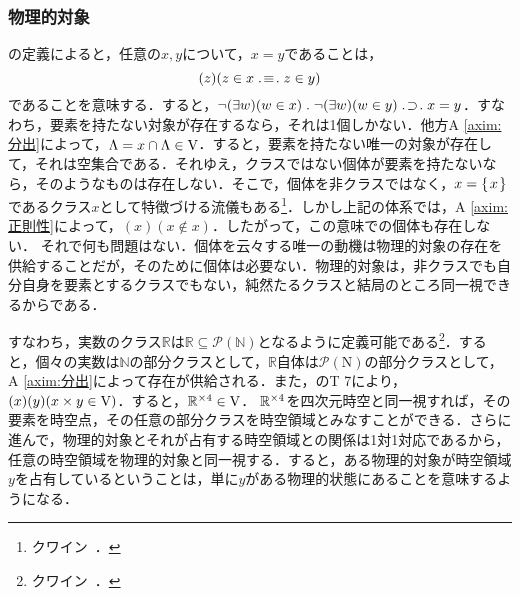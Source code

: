 \subsubsection{物理的対象}
\label{sssec:物理的対象}

の定義によると，任意の$ x,y $について，$ x = y $であることは，
\[
    (z)(z\in x\case{3}{1}{1}z\in y)
\]
であることを意味する．すると，$ \neg(\exists w)(w\in x)\con{1}\neg(\exists w)(w\in y)\case{1}{1}{1}x = y $．すなわち，要素を持たない対象が存在するなら，それは1個しかない．他方A \ref{axim:分出}によって，$ \Lambda = x\cap\Lambda\in\mathrm{V} $．すると，要素を持たない唯一の対象が存在して，それは空集合である．それゆえ，クラスではない個体が要素を持たないなら，そのようなものは存在しない．そこで，個体を非クラスではなく，$ x = \{\mspace{2mu}x\mspace{2mu}\} $であるクラス$ x $として特徴づける流儀もある\footnote{
    クワイン~\cite[p.\,29]{クワインa}．
}．しかし上記の体系では，A \ref{axim:正則性}によって，$ (x)(x\notin x) $．したがって，この意味での個体も存在しない．
それで何も問題はない．個体を云々する唯一の動機は物理的対象の存在を供給することだが，そのために個体は必要ない．物理的対象は，非クラスでも自分自身を要素とするクラスでもない，純然たるクラスと結局のところ同一視できるからである．

すなわち，実数のクラス$\mathbb{R}$は$ \mathbb{R}\subseteq\mathcal{P}(\mathbb{N}) $となるように定義可能である\footnote{
    クワイン~\cite[pp.\,113--117]{クワインa}．
}．すると，個々の実数は$\mathbb{N}$の部分クラスとして，$\mathbb{R}$自体は$ \mathcal{P}(\mathrm{N}) $の部分クラスとして，A \ref{axim:分出}によって存在が供給される．また，のT 7により，$ (x)(y)(x\times y\in\mathrm{V}) $．すると，$ \mathbb{R}^{\times 4}\in\mathrm{V} $．
$ \mathbb{R}^{\times 4} $を四次元時空と同一視すれば，その要素を時空点，その任意の部分クラスを時空領域とみなすことができる．さらに進んで，物理的対象とそれが占有する時空領域との関係は1対1対応であるから，任意の時空領域を物理的対象と同一視する．すると，ある物理的対象が時空領域$y$を占有しているということは，単に$y$がある物理的状態にあることを意味するようになる．

